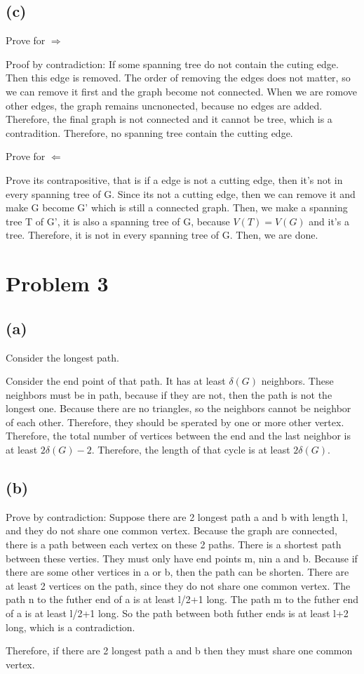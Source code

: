 \documentclass[11pt]{article}
\begin{document}
\subsection*{(c)}
Prove for $\Rightarrow $

Proof by contradiction:
If some spanning tree do not contain the cuting edge. Then this edge is removed. The order of removing the edges does not matter, so we can remove it first and the graph become not connected. When we are romove other edges, the graph remains uncnonected, because no edges are added. Therefore, the final graph is not connected and it cannot be tree, which is a contradition. Therefore, no spanning tree contain the cutting edge.

Prove for $\Leftarrow $

Prove its contrapositive, that is if a edge is not a cutting edge, then it's not in every spanning tree of G.
Since its not a cutting edge, then we can remove it and make G become G' which is still a connected graph. Then, we make a spanning tree T of G', it is also a spanning tree of G, because $V (T ) = V (G)$ and it's a tree. Therefore, it is not in every spanning tree of G. Then, we are done.

\section{Problem 3}
\subsection*{(a)}
Consider the longest path.

Consider the end point of that path. It has at least $\delta(G)$ neighbors. These neighbors must be in path, because if they are not, then the path is not the longest one.
Because there are no triangles, so the neighbors cannot be neighbor of each other. Therefore, they should be sperated by one or more other vertex. Therefore, the total number of vertices between the end and the last neighbor is at least $2\delta(G)-2$. Therefore, the length of that cycle is at least $2\delta(G)$.

\subsection*{(b)}
Prove by contradiction: 
Suppose there are 2 longest path a and b with length l, and they do not share one common vertex. Because the graph are connected, there is a path between each vertex on these 2 paths. There is a shortest path between these verties. They must only have end points m, nin a and b. Because if there are some other vertices in a or b, then the path can be shorten. There are at least 2 vertices on the path, since they do not share one common vertex. The path n to the futher end of a is at least l/2+1 long. The path m to the futher end of a is at least l/2+1 long. So the path between both futher ends is at least l+2 long, which is a contradiction.

Therefore, if there are 2 longest path a and b then they must share one common vertex.
\end{document}
